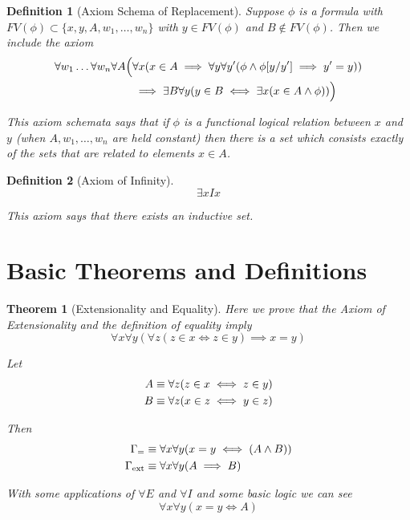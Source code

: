 \documentclass[12pt]{article}
\theoremstyle{break}
\newtheorem{definition}{Definition}[section]
\theoremstyle{break}
\newtheorem{theorem}{Theorem}[section]
\theoremstyle{break}
\theoremstyle{break}
\theoremstyle{break}
\newtheorem{informal definition}[definition]{Informal Definition}
\begin{document}
\begin{definition}[Axiom Schema of Replacement]
Suppose $\phi$ is a formula with $FV(\phi) \subset \{x, y, A, w_1, \ldots, w_n\}$ with $y\in FV(\phi)$ and $B\not \in FV(\phi)$.
Then we include the axiom
\begin{align}
\forall w_1\ldots\forall w_n \forall A \Big(& \forall x(x\in A \implies \forall y \forall y' (\phi \land \phi[y/y']\implies y'=y)) \notag\\
&  \implies \exists B \forall y(y\in B \iff \exists x (x\in A \land \phi))\Big) \notag
\end{align}

This axiom schemata says that if $\phi$ is a functional logical relation between $x$ and $y$ (when $A, w_1, \ldots, w_n$ are held constant) then there is a set which consists exactly of the sets that are related to elements $x\in A$.
\end{definition}

\begin{definition}[Axiom of Infinity]
$$
\exists x Ix
$$

This axiom says that there exists an inductive set.

%
%
\end{definition}

\section{Basic Theorems and Definitions}

\begin{theorem}[Extensionality and Equality]
Here we prove that the Axiom of Extensionality and the definition of equality imply
$$
\forall x \forall y \left(\forall z(z\in x \iff z \in y) \implies x=y\right)
$$

Let
\begin{align}
A &\equiv \forall z (z\in x \iff z \in y) \notag\\
B &\equiv \forall z (x\in z \iff y \in z) \notag
\end{align}

Then
\begin{align}
\Gamma_= &\equiv \forall x \forall y (x=y \iff (A\land B)) \notag\\
\Gamma_{\text{ext}} &\equiv \forall x \forall y (A \implies B)
\end{align}

With some applications of $\forall E$ and $\forall I$ and some basic logic we can see
$$
\forall x \forall y (x=y \iff A)
$$
\end{theorem}
\end{document}
